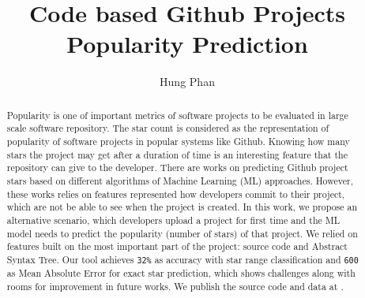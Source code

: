 \documentclass[sigconf]{acmart}
\title[CodeBasedStarPrediction]{Code based Github Projects Popularity Prediction}
\author[1]{Hung Phan}
\affil[1]{Computer Science Department, Iowa State University}
\begin{document}
\begin{abstract}
Popularity is one of important metrics of software projects to be evaluated in large scale software repository. The star count is considered as the representation of popularity of software projects in popular systems like Github. Knowing how many stars the project may get after a duration of time is an interesting feature that the repository can give to the developer. There are works on predicting Github project stars based on different algorithms of Machine Learning (ML) approaches. However, these works relies on features represented how developers commit to their project, which are not be able to see when the project is created. In this work, we propose an alternative scenario, which developers upload a project for first time and the ML model needs to predict the popularity (number of stars) of that project. We relied on features built on the most important part of the project: source code and Abstract Syntax Tree. Our tool achieves \texttt{32\%} as accuracy with star range classification and \texttt{600} as Mean Absolute Error for exact star prediction, which shows challenges along with rooms for improvement in future works. We publish the source code and data at \cite{001} .
\end{abstract}





\maketitle








\clearpage



\end{document}
